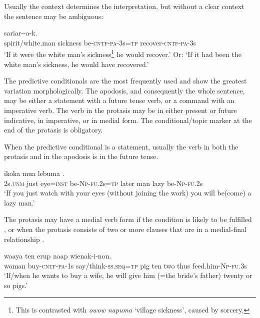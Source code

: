 Usually the context determines the interpretation, but without a clear context the sentence may be ambiguous:  

\ea%
\label{ex:8:x1648}
\gll [Inasin  napuma  ik-\textstyleEmphasizedVernacularWords{ek}-a-k=\textstyleEmphasizedVernacularWords{na}]  sariar--a-k.\\
spirit/white.man sickness be-\textsc{cntf}-\textsc{pa}-3s=\textsc{tp} recover-\textsc{cntf}-\textsc{pa}-3s\\
\glt`If it were the white man's sickness\footnote{This is contrasted with \textit{owow napuma} `village sickness', caused by sorcery.} he would recover.' Or: `If it had been the white man's sickness, he would have recovered.'
\z


The predictive conditionals are the most frequently used and show the greatest variation morphologically. The apodosis, and consequently the whole sentence, may be either a statement with a future tense verb, or a command with an imperative verb. The verb in the protasis may be in either present or future indicative, in imperative, or in medial form. The conditional/topic marker at the end of the protasis is obligatory. 

When the predictive conditional is a statement, usually the verb in both the protasis and in the apodosis is in the future tense.

\ea%
\label{ex:8:x1652}
\gll [No  oram  mokok=iw  \textstyleEmphasizedVernacularWords{ika-i-nan=na}]  ikoka  mua  lebuma \textstyleEmphasizedVernacularWords{-}\textstyleEmphasizedVernacularWords{-}.\\
2s.\textsc{unm} just  eye=\textsc{inst} be-\textsc{Np}-\textsc{fu}.2s=\textsc{tp} later  man  lazy be-\textsc{Np}-\textsc{fu}.2s\\
\glt`If you just watch with your eyes (without joining the work) you will be(come) a lazy man.'
\z


The protasis may have a medial verb form if the condition is likely to be fulfilled , or when the protasis consists of two or more clauses that are in a medial-final relationship .

\ea%
\label{ex:8:x1654}
\gll [Emeria  \textstyleEmphasizedVernacularWords{sesenar-ek-a-m} \textstyleEmphasizedVernacularWords{na-ep=na}] waaya  ten  erup naap  wienak-i-non.\\
woman  buy-\textsc{cntf}-\textsc{pa}-1s say/think-\textsc{ss}.\textsc{seq}=\textsc{tp} pig  ten  two thus  feed.him-\textsc{Np}-\textsc{fu}.3s\\
\glt`If/when he wants to buy a wife, he will give him (=the bride's father) twenty or so pigs.'
\z


